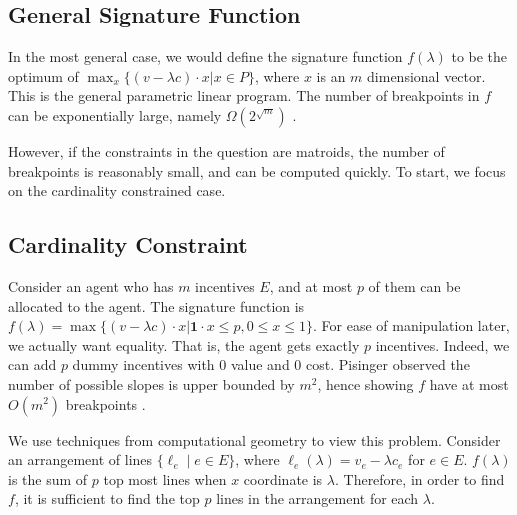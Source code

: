 \documentclass{article}
\begin{document}
\subsection{General Signature Function}

In the most general case, we would define the signature function $f(\lambda)$ to be the optimum of $\max_x \{(v-\lambda c)\cdot x | x\in P\}$, where $x$ is an $m$ dimensional vector. This is the general parametric linear program. The number of breakpoints in $f$ can be exponentially large, namely $\Omega(2^{\sqrt{m}})$ \cite{Zadeh73b,Murty80,Carstensen83}.

However, if the constraints in the question are matroids, the number of breakpoints is reasonably small, and can be computed quickly. To start, we focus on the cardinality constrained case.

\subsection{Cardinality Constraint}

Consider an agent who has $m$ incentives $E$, and at most $p$ of them can be allocated to the agent. The signature function is $f(\lambda) = \max \{(v-\lambda c)\cdot x | \mathbf{1}\cdot x \leq p, 0\leq x\leq 1\}$. For ease of manipulation later, we actually want equality. That is, the agent gets exactly $p$ incentives. Indeed, we can add $p$ dummy incentives with $0$ value and $0$ cost. Pisinger observed the number of possible slopes is upper bounded by $m^2$, hence showing $f$ have at most $O(m^2)$ breakpoints . 

We use techniques from computational geometry to view this problem. Consider an arrangement of lines $\{\ell_e \mid e\in E\}$, where $\ell_e(\lambda) = v_e-\lambda c_e$ for $e\in E$. $f(\lambda)$ is the sum of $p$ top most lines when $x$ coordinate is $\lambda$. Therefore, in order to find $f$, it is sufficient to find the top $p$ lines in the arrangement for each $\lambda$. 
 
\end{document}
